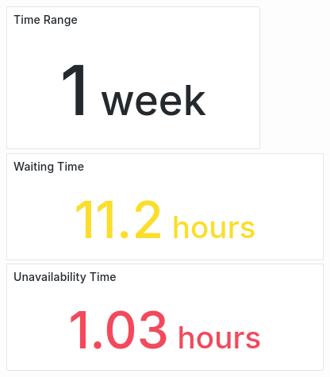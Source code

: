 \documentclass{article}
\begin{document}
\includegraphics[width=\textwidth]{panel_0016-0010.png}
\includegraphics[width=\textwidth]{panel_0016-0014.png}
\includegraphics[width=\textwidth]{panel_0016-0019.png}
\end{document}
